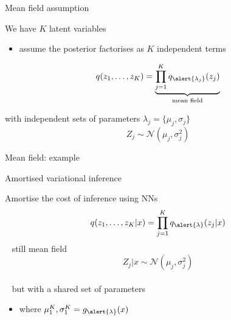 \documentclass[14pt]{beamer}
\begin{document}
\begin{frame}{Mean field assumption}

We have $K$ latent variables\\
\begin{itemize}
	\item assume the posterior factorises as $K$ independent terms
\end{itemize}


\begin{equation*}
q(z_1, \ldots, z_K) = \underbrace{\prod_{j=1}^K q_{\alert{\lambda_j}}(z_j)}_{\text{mean field}}
\end{equation*} \pause

with independent sets of parameters $\lambda_j = \{\mu_j, \sigma_j\}$
$$Z_j \sim \mathcal N(\mu_j, \sigma_j^2)$$

\end{frame}

\begin{frame}{Mean field: example}
\begin{figure}
\center
{}
\end{figure}

\end{frame}


\begin{frame}{Amortised variational inference}

Amortise the cost of inference using NNs
\begin{equation*}
q(z_1, \ldots, z_K|x) = \prod_{j=1}^K q_{\alert{\lambda}}(z_j|x)
\end{equation*} \pause
~ still mean field
$$Z_j|x \sim \mathcal N(\mu_j, \sigma_j^2)$$\\  \pause
~ but with a shared set of parameters
\begin{itemize}
	\item where $\mu_1^K, \sigma_1^K = g_{\alert{\lambda}}(x)$ 
\end{itemize}

\end{frame}
\end{document}
